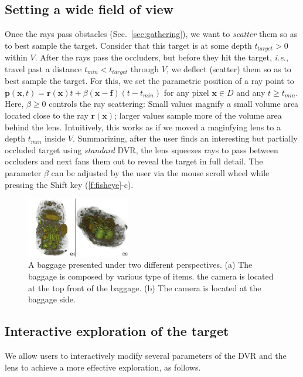 \subsection{Setting a wide field of view}
%
Once the rays pass obstacles (Sec.~\ref{sec:gathering}), we want to \emph{scatter} them so as to best sample the target. Consider that this target is at some depth $t_{target}>0$ within $V$. After the rays pass the occluders, but before they hit the target, \emph{i.e.}, travel past a distance $t_{min} < t_{target}$ through $V$, we deflect (scatter) them so as to best sample the target. For this, we set the parametric position of a ray point to $\mathbf{p}(\mathbf{x}, t) = \mathbf{r}(\mathbf{x})t + \beta (\mathbf{x}-\mathbf{f})(t-t_{min})$ for any pixel $\mathbf{x} \in D$ and any $t \geq t_{min}$. Here, $\beta \geq 0$ controls the ray scattering: Small values magnify a small volume area located close to the ray $\mathbf{r}(\mathbf{x})$; larger values sample more of the volume area behind the lens. Intuitively, this works as if we moved a maginfying lens to a depth $t_{min}$ inside $V$. Summarizing, after the user finds an interesting but partially occluded target using \emph{standard} DVR, the lens squeezes rays to pass between occluders and next fans them out to reveal the target in full detail. The parameter $\beta$ can be adjusted by the user via the mouse scroll wheel while pressing the Shift key (\autoref{f:fisheye}-c).
%
%
\begin{figure}[htbp]
\centering
\includegraphics [width=0.4\textwidth]{images/bagage_orientation_bis.pdf}
\caption{A baggage presented under two different perspectives. (a) The baggage is composed by various type of items. the camera is located at the top front of the baggage. (b) The camera is located at the baggage side.}
\label{f:baggage_orientation}
\end{figure}

\subsection{Interactive exploration of the target}
%
We allow users to interactively modify several parameters of the DVR and the lens to achieve a more effective exploration, as follows.

